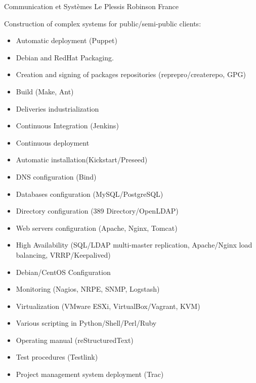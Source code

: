 \documentclass[10pt,a4paper,sans]{moderncv}        %
\begin{document}
              {Communication et Systèmes}
              {Le Plessis Robinson}
              {France}
              {Construction of complex systems for public/semi-public clients:
                \begin{itemize}
                \item Automatic deployment (Puppet)
                \item Debian and RedHat Packaging.
                \item Creation and signing of packages repositories (reprepro/createrepo, GPG)
                \item Build (Make, Ant)
                \item Deliveries industrialization
		\item Continuous Integration (Jenkins)
                \item Continuous deployment
                \item Automatic installation(Kickstart/Preseed)
                \item DNS configuration (Bind)
                \item Databases configuration (MySQL/PostgreSQL)
                \item Directory configuration (389 Directory/OpenLDAP)
                \item Web servers configuration (Apache, Nginx, Tomcat)
                \item High Availability (SQL/LDAP multi-master replication, Apache/Nginx load balancing, VRRP/Keepalived)
                \item Debian/CentOS Configuration
                \item Monitoring (Nagios, NRPE, SNMP, Logstash)
                \item Virtualization (VMware ESXi, VirtualBox/Vagrant, KVM)
                \item Various scripting in Python/Shell/Perl/Ruby
                \item Operating manual (reStructuredText)
                \item Test procedures (Testlink)
                \item Project management system deployment (Trac)
                \end{itemize}
              }
\end{document}
